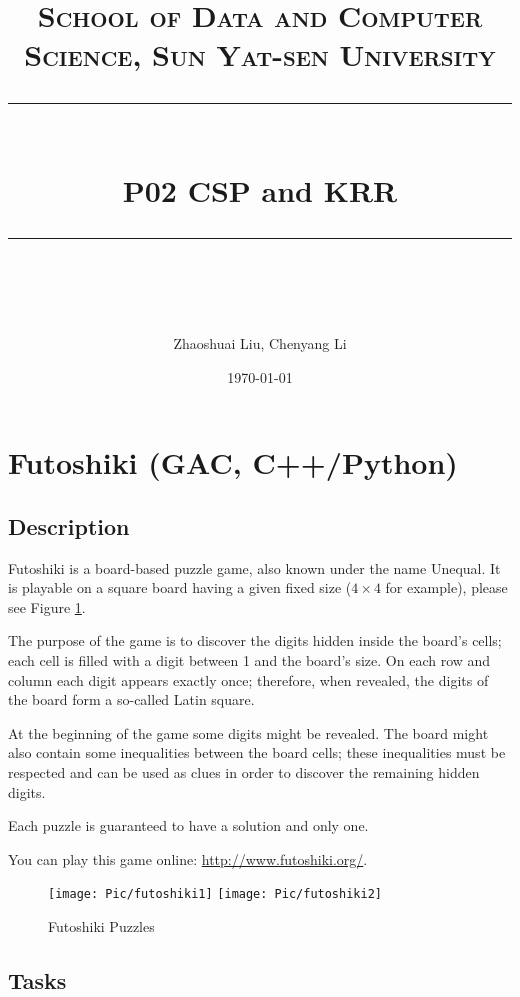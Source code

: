 ﻿\documentclass[a4paper, 11pt]{article}
\title{	
\normalfont \normalsize
\textsc{School of Data and Computer Science, Sun Yat-sen University} \\ [25pt] %
\rule{\textwidth}{0.5pt} \\[0.4cm] %
\huge  P02  CSP and KRR\\ %
\rule{\textwidth}{2pt} \\[0.5cm] %
\author{Zhaoshuai Liu, Chenyang Li}
\date{\normalsize\today}
}
\begin{document}
\maketitle
\tableofcontents
\newpage




\section{Futoshiki (GAC, C++/Python)}
\subsection{Description}
Futoshiki is a board-based puzzle game, also known under the name Unequal. It is playable on a square board having a given fixed size ($4\times4$ for example), please see Figure \ref{fig:futoshiki}.

The purpose of the game is to discover the digits hidden inside the board's cells; each cell is filled with a digit between 1 and the board's size. On each row and column each digit appears exactly once; therefore, when revealed, the digits of the board form a so-called Latin square.

At the beginning of the game some digits might be revealed. The board might also contain some inequalities between the board cells; these inequalities must be respected and can be used as clues in order to discover the remaining hidden digits.

Each puzzle is guaranteed to have a solution and only one.

You can play this game online: \url{http://www.futoshiki.org/}.
\begin{figure}[h]
  \centering
  \texttt{[image: Pic/futoshiki1]}
  \qquad
  \texttt{[image: Pic/futoshiki2]}
  \caption{Futoshiki Puzzles}
  \label{fig:futoshiki}
\end{figure}

\subsection{Tasks}
\end{document}
